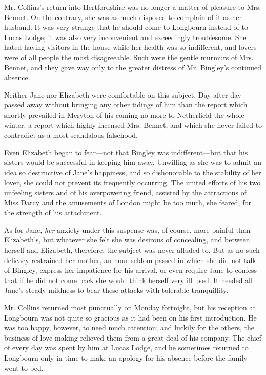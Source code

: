 Mr. Collins's return into Hertfordshire was no longer a matter of pleasure to Mrs. Bennet. On the contrary, she was as much disposed to complain of it as her husband. It was very strange that he should come to Longbourn instead of to Lucas Lodge; it was also very inconvenient and exceedingly troublesome. She hated having visitors in the house while her health was so indifferent, and lovers were of all people the most disagreeable. Such were the gentle murmurs of Mrs. Bennet, and they gave way only to the greater distress of Mr. Bingley's continued absence.

Neither Jane nor Elizabeth were comfortable on this subject. Day after day passed away without bringing any other tidings of him than the report which shortly prevailed in Meryton of his coming no more to Netherfield the whole winter; a report which highly incensed Mrs. Bennet, and which she never failed to contradict as a most scandalous falsehood.

Even Elizabeth began to fear---not that Bingley was indifferent---but that his sisters would be successful in keeping him away. Unwilling as she was to admit an idea so destructive of Jane's happiness, and so dishonorable to the stability of her lover, she could not prevent its frequently occurring. The united efforts of his two unfeeling sisters and of his overpowering friend, assisted by the attractions of Miss Darcy and the amusements of London might be too much, she feared, for the strength of his attachment.

As for Jane, {\em her} anxiety under this suspense was, of course, more painful than Elizabeth's, but whatever she felt she was desirous of concealing, and between herself and Elizabeth, therefore, the subject was never alluded to. But as no such delicacy restrained her mother, an hour seldom passed in which she did not talk of Bingley, express her impatience for his arrival, or even require Jane to confess that if he did not come back she would think herself very ill used. It needed all Jane's steady mildness to bear these attacks with tolerable tranquillity.

Mr. Collins returned most punctually on Monday fortnight, but his reception at Longbourn was not quite so gracious as it had been on his first introduction. He was too happy, however, to need much attention; and luckily for the others, the business of love-making relieved them from a great deal of his company. The chief of every day was spent by him at Lucas Lodge, and he sometimes returned to Longbourn only in time to make an apology for his absence before the family went to bed.

